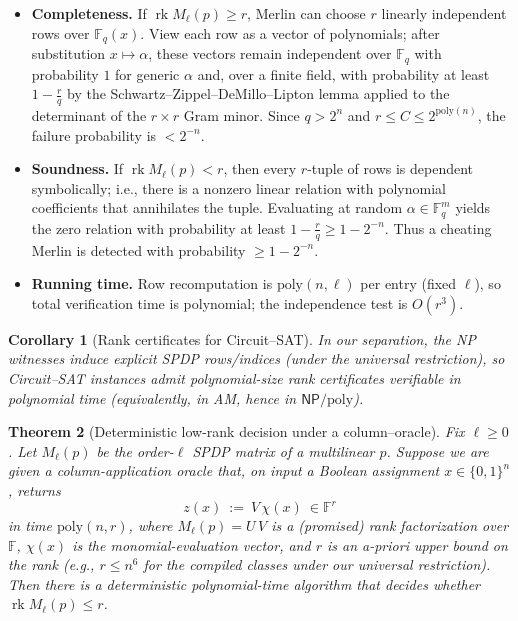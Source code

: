 \documentclass[12pt]{article}
\newtheorem{theorem}{Theorem}
\newtheorem{corollary}[theorem]{Corollary}
\theoremstyle{definition}
\theoremstyle{definition}
\theoremstyle{remark}
\theoremstyle{remark}
\begin{document}
\begin{itemize}
\item \textbf{Completeness.} If $\operatorname{rk}M_\ell(p)\ge r$, Merlin can choose $r$ linearly independent rows over $\mathbb{F}_q(x)$. View each row as a vector of polynomials; after substitution $x\mapsto\alpha$, these vectors remain independent over $\mathbb{F}_q$ with probability $1$ for generic $\alpha$ and, over a finite field, with probability at least $1-\frac{r}{q}$ by the Schwartz--Zippel--DeMillo--Lipton lemma applied to the determinant of the $r\times r$ Gram minor. Since $q>2^n$ and $r\le C\le 2^{\mathrm{poly}(n)}$, the failure probability is $<2^{-n}$.

\item \textbf{Soundness.} If $\operatorname{rk}M_\ell(p)<r$, then every $r$-tuple of rows is dependent symbolically; i.e., there is a nonzero linear relation with polynomial coefficients that annihilates the tuple. Evaluating at random $\alpha\in\mathbb{F}_q^m$ yields the zero relation with probability at least $1-\frac{r}{q}\ge 1-2^{-n}$. Thus a cheating Merlin is detected with probability $\ge 1-2^{-n}$.

\item \textbf{Running time.} Row recomputation is $\mathrm{poly}(n,\ell)$ per entry (fixed $\ell$), so total verification time is polynomial; the independence test is $O(r^3)$.
\end{itemize}

\begin{corollary}[Rank certificates for Circuit--SAT]\label{cor:rank-cert-circuitsat}
In our separation, the NP witnesses induce explicit SPDP rows/indices (under the universal restriction), so Circuit--SAT instances admit polynomial-size rank certificates verifiable in polynomial time (equivalently, in AM, hence in $\mathsf{NP}/\mathrm{poly}$).
\end{corollary}

\begin{theorem}[Deterministic low-rank decision under a column--oracle]\label{thm:det-rank-col-oracle}
Fix $\ell\ge 0$. Let $M_\ell(p)$ be the order-$\ell$ SPDP matrix of a multilinear $p$. Suppose we are given a column-application oracle that, on input a Boolean assignment $x\in\{0,1\}^n$, returns
\[
z(x)\ :=\ V\,\chi(x)\ \in\mathbb{F}^r
\]
in time $\mathrm{poly}(n,r)$, where $M_\ell(p)=U\,V$ is a (promised) rank factorization over $\mathbb{F}$, $\chi(x)$ is the monomial-evaluation vector, and $r$ is an a-priori upper bound on the rank (e.g., $r\le n^6$ for the compiled classes under our universal restriction). Then there is a deterministic polynomial-time algorithm that decides whether $\operatorname{rk}M_\ell(p)\le r$.
\end{theorem}
\end{document}
